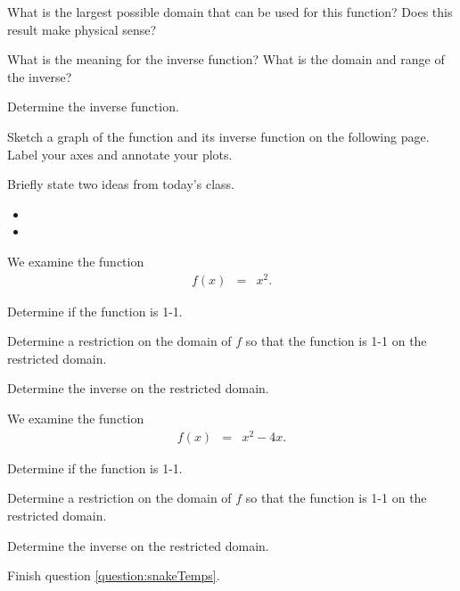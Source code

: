 \begin{problem}
  \begin{subproblem}
  \item What is the largest possible domain that can be used for this
    function? Does this result make physical sense?
    \vfill
  \item What is the meaning for the inverse function? What is the
    domain and range of the inverse?
    \vfill
  \item Determine the inverse function.
    \vfill
  \item Sketch a graph of the function and its inverse function on the
    following page. Label your axes and annotate your plots.  
  \end{subproblem}

\end{problem}

\postClass

\begin{problem}
\item Briefly state two ideas from today's class.
  \begin{itemize}
  \item 
  \item 
  \end{itemize}
\item  We examine the function
	\begin{eqnarray*}
		f(x) & = & x^2.
	\end{eqnarray*}
  \begin{subproblem}
    \item Determine if the function is 1-1.
    \item Determine a restriction on the domain of $f$ so that the function 
	    is 1-1 on the restricted domain.
    \item Determine the inverse on the restricted domain.
  \end{subproblem}
\item  We examine the function
  \begin{eqnarray*}
    f(x) & = & x^2-4x.
  \end{eqnarray*}
  \begin{subproblem}
  \item Determine if the function is 1-1.
  \item Determine a restriction on the domain of $f$ so that the function 
    is 1-1 on the restricted domain.
  \item Determine the inverse on the restricted domain.
  \end{subproblem}
\item Finish question \ref{question:snakeTemps}.
\end{problem}



